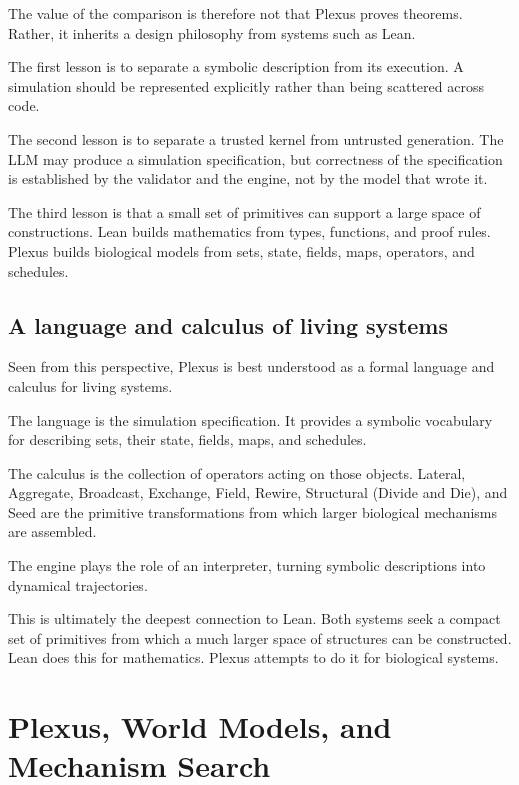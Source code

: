 \documentclass[11pt]{article}
\begin{document}
The value of the comparison is therefore not that Plexus proves theorems. Rather,
it inherits a design philosophy from systems such as Lean.

The first lesson is to separate a symbolic description from its execution. A
simulation should be represented explicitly rather than being scattered across code.

The second lesson is to separate a trusted kernel from untrusted generation. The
LLM may produce a simulation specification, but correctness of the specification is
established by the validator and the engine, not by the model that wrote it.

The third lesson is that a small set of primitives can support a large space of
constructions. Lean builds mathematics from types, functions, and proof rules.
Plexus builds biological models from sets, state, fields, maps, operators, and schedules.

\subsection{A language and calculus of living systems}

Seen from this perspective, Plexus is best understood as a formal language and
calculus for living systems.

The language is the simulation specification. It provides a symbolic vocabulary for
describing sets, their state, fields, maps, and schedules.

The calculus is the collection of operators acting on those objects. Lateral,
Aggregate, Broadcast, Exchange, Field, Rewire, Structural (Divide and Die), and
Seed are the primitive
transformations from which larger biological mechanisms are assembled.

The engine plays the role of an interpreter, turning symbolic descriptions into
dynamical trajectories.

This is ultimately the deepest connection to Lean. Both systems seek a compact set
of primitives from which a much larger space of structures can be constructed.
Lean does this for mathematics. Plexus attempts to do it for biological systems.


\section{Plexus, World Models, and Mechanism Search}
\label{sec:mechanism-search}
\end{document}
